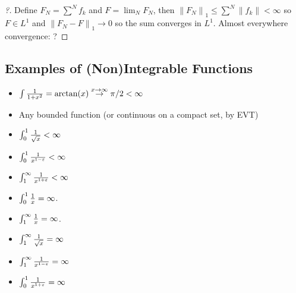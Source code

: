 \begin{proof}[?]

Define \(F_N = \sum^N f_k\) and \(F = \lim_N F_N\), then
\({\left\lVert {F_N} \right\rVert}_1 \leq \sum^N {\left\lVert {f_k} \right\rVert} < \infty\)
so \(F\in L^1\) and \({\left\lVert {F_N - F} \right\rVert}_1 \to 0\) so
the sum converges in \(L^1\). Almost everywhere convergence: ?

\end{proof}

\hypertarget{examples-of-nonintegrable-functions}{%
\subsection{Examples of (Non)Integrable
Functions}\label{examples-of-nonintegrable-functions}}

\begin{example}

\envlist

\begin{itemize}
\item
  \(\int {1\over 1 + x^2} = \arctan(x) \overset{x\to\infty}\to \pi/2 < \infty\)
\item
  Any bounded function (or continuous on a compact set, by EVT)
\item
  \(\int_0^1 {1 \over \sqrt{x}} < \infty\)
\item
  \(\int_0^1 {1\over x^{1-\varepsilon}} < \infty\)
\item
  \(\int_1^\infty {1\over x^{1+\varepsilon}} < \infty\)
\end{itemize}

\end{example}

\begin{example}

\envlist

\begin{itemize}
\tightlist
\item
  \(\int_0^1 {1\over x} = \infty\).
\item
  \(\int_1^\infty {1\over x} = \infty\).
\item
  \(\int_1^\infty {1 \over \sqrt{x}} = \infty\)
\item
  \(\int_1^\infty {1\over x^{1-\varepsilon}} = \infty\)
\item
  \(\int_0^1 {1\over x^{1+\varepsilon}} = \infty\)
\end{itemize}

\end{example}

